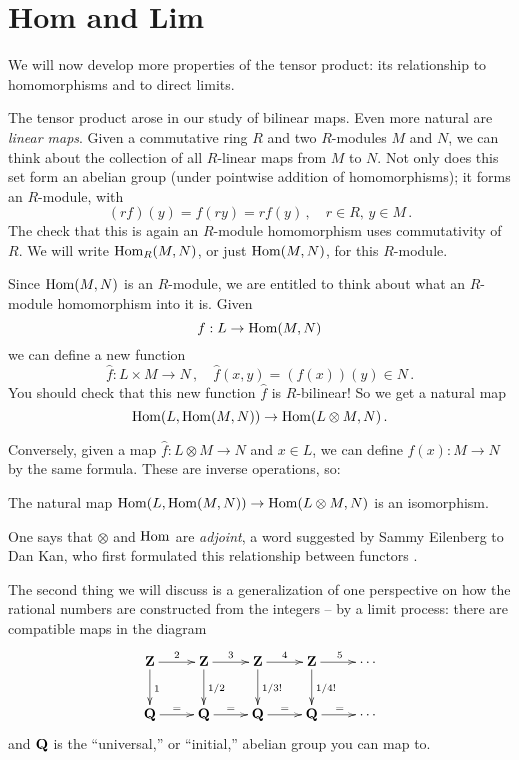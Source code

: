 \section{Hom and Lim}\label{limits}

We will now develop more properties of the tensor product: its relationship to
homomorphisms and to direct limits. 

The tensor product arose in our study of bilinear maps. Even more natural are
{\em linear maps}. Given a commutative ring $R$ and two $R$-modules $M$ and 
$N$, we can think about the collection of all $R$-linear maps from $M$ to $N$.
Not only does this set form an abelian group (under pointwise addition of 
homomorphisms); it forms an $R$-module, with
\[
(rf)(y)=f(ry)=rf(y)\,,\quad r\in R,\, y\in M\,.
\]
The check that this is again an $R$-module homomorphism uses commutativity of
$R$. We will write $\operatorname{Hom}_R(M,N)$, or just $\operatorname{Hom}(M,N)$, for this $R$-module. 

Since $\operatorname{Hom}(M,N)$ is an $R$-module, we are entitled to think about what 
an $R$-module homomorphism into it is. Given 
\[
f:L\to\operatorname{Hom}(M,N)
\]
we can define a new function 
\[
\hat f:L\times M\to N\,,\quad \hat f(x,y)=(f(x))(y)\in N\,.
\]
You should check that this new function $\hat f$ is $R$-bilinear! So we get 
a natural map
\[
\operatorname{Hom}(L,\operatorname{Hom}(M,N))\to\operatorname{Hom}(L\otimes M,N)\,.
\]

Conversely, given a map $\hat f:L\otimes M\to N$ and $x\in L$, we can define
$f(x):M\to N$ by the same formula. These are inverse operations, so:
\begin{lemma}
The natural map $\operatorname{Hom}(L,\operatorname{Hom}(M,N))\to\operatorname{Hom}(L\otimes M,N)$ is an isomorphism.
\end{lemma}

One says that $\otimes$ and $\operatorname{Hom}$ are {\em adjoint}, a word suggested by 
Sammy Eilenberg to Dan Kan, who first formulated this relationship between
functors \cite{kan}. 


The second thing we will discuss is a generalization of one perspective on
how the rational numbers are constructed from the integers -- by a limit 
process: there are compatible maps in the diagram 
\[
\xymatrix{
\Z \ar[r]^2 \ar[d]^1 & \Z \ar[r]^3 \ar[d]^{1/2} & \Z \ar[r]^4 \ar[d]^{1/3!}
& \Z \ar[r]^5 \ar[d]^{1/4!} & \cdots \\
\QQ \ar[r]^= & \QQ \ar[r]^= & \QQ \ar[r]^= & \QQ \ar[r]^= & \cdots
}\]
and $\mathbf Q$ is the ``universal,'' or ``initial,'' abelian group you can map to.


